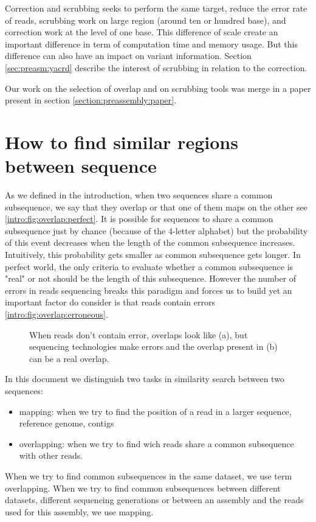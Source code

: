 \documentclass[main.tex]{subfiles}
\begin{document}
Correction and scrubbing seeks to perform the same target, reduce the error rate of reads, scrubbing work on large region (around ten or hundred base), and correction work at the level of one base. This difference of scale create an important difference in term of computation time and memory usage. But this difference can also have an impact on variant information. Section \ref{sec:preasm:yacrd} describe the interest of scrubbing in relation to the correction.

Our work on the selection of overlap and on scrubbing tools was merge in a paper present in section \ref{section:preassembly:paper}.

\section{How to find similar regions between sequence} \label{sec:preasm:ovl}

As we defined in the introduction, when two sequences share a common subsequence, we say that they overlap or that one of them maps on the other see \ref{intro:fig:overlap:perfect}. It is possible for sequences to share a common subsequence just by chance (because of the 4-letter alphabet) but the probability of this event decreases when the length of the common subsequence increases. Intuitively, this probability gets smaller as common subsequence gets longer. In perfect world, the only criteria to evaluate whether a common subsequence is "real" or not should be the length of this subsequence. However the number of errors in reads sequencing breaks this paradigm and forces us to build yet an important factor do consider is that reads contain errors \ref{intro:fig:overlap:erroneous}.

\begin{figure}[ht]
    \centering
    \caption{When reads don't contain error, overlaps look like (a), but sequencing technologies make errors and the overlap present in (b) can be a real overlap.}
    \label{intro:fig:overlap}
\end{figure}

In this document we distinguish two tasks in similarity search between two sequences:
\begin{itemize}
    \item mapping: when we try to find the position of a read in a larger sequence, reference genome, contigs
    \item overlapping: when we try to find wich reads share a common subsequence with other reads. 
\end{itemize}
When we try to find common subsequences in the same dataset, we use term overlapping. When we try to find common subsequences between different datasets, different sequencing generations or between an assembly and the reads used for this assembly, we use mapping.
\end{document}
